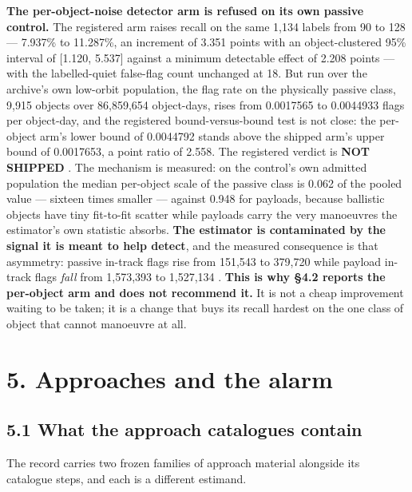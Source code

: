 \documentclass[11pt]{article}
\begin{document}
\textbf{The per-object-noise detector arm is refused on its own passive control.} The registered arm raises recall on the same 1,134 labels from 90 to 128 --- 7.937\% to 11.287\%, an increment of 3.351 points with an object-clustered 95\% interval of [1.120, 5.537] against a minimum detectable effect of 2.208 points --- with the labelled-quiet false-flag count unchanged at 18. But run over the archive's own low-orbit population, the flag rate on the physically passive class, 9,915 objects over 86,859,654 object-days, rises from 0.0017565 to 0.0044933 flags per object-day, and the registered bound-versus-bound test is not close: the per-object arm's lower bound of 0.0044792 stands above the shipped arm's upper bound of 0.0017653, a point ratio of 2.558. The registered verdict is \textbf{NOT SHIPPED}%
. The mechanism is measured: on the control's own admitted population the median per-object scale of the passive class is 0.062 of the pooled value --- sixteen times smaller --- against 0.948 for payloads, because ballistic objects have tiny fit-to-fit scatter while payloads carry the very manoeuvres the estimator's own statistic absorbs. \textbf{The estimator is contaminated by the signal it is meant to help detect}, and the measured consequence is that asymmetry: passive in-track flags rise from 151,543 to 379,720 while payload in-track flags \emph{fall} from 1,573,393 to 1,527,134%
. \textbf{This is why \S{}4.2 reports the per-object arm and does not recommend it.} It is not a cheap improvement waiting to be taken; it is a change that buys its recall hardest on the one class of object that cannot manoeuvre at all.

\section*{5. Approaches and the alarm}

\subsection*{5.1 What the approach catalogues contain}

The record carries two frozen families of approach material alongside its catalogue steps, and each is a different estimand.
\end{document}
